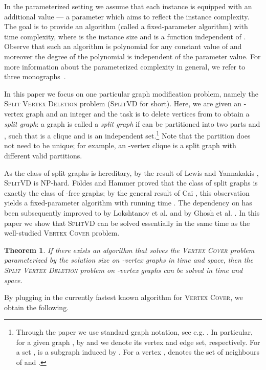 \documentclass{article}
\newcommand{\splitlong}{\textsc{Split Vertex Deletion}\xspace}
\newcommand{\splitvd}{\textsc{SplitVD}\xspace}
\newcommand{\vertexcover}{\textsc{Vertex Cover}\xspace}
\newtheorem{theorem}{Theorem}[section]
\theoremstyle{definition}
\begin{document}
In the parameterized setting we assume that each instance is equipped with 
an additional value  --- a parameter which aims to reflect
the instance complexity.
The goal is to provide an algorithm (called a fixed-parameter algorithm) with 
time complexity, where  is the instance size and 
is a function independent of .
Observe that such an algorithm is polynomial for any constant value of 
and moreover the degree of the polynomial is independent of the parameter value.
For more information about the parameterized complexity in general,
we refer to three monographs~\cite{downey-fellows:book, grohe:book, niedermeier:book}.

In this paper we focus on one particular graph modification problem, namely
the \splitlong problem (\splitvd for short). Here, we are given an -vertex graph
 and an integer  and the task is to delete  vertices from 
to obtain a {\em{split graph}}: a graph  is called a {\em{split graph}}
if  can be partitioned into two parts  and , such that 
is a clique and  is an independent set.\footnote{Through the paper
  we use standard graph notation, see e.g. \cite{diestel}.
  In particular, for a given graph , by  and  we denote
  its vertex and edge set, respectively. For a set ,
   is a subgraph induced by . For a vertex ,  denotes the set of
  neighbours of  and .}
Note that the partition  does not need to be unique; for example,
an -vertex clique is a split graph with  different valid partitions.

As the class of split graphs is hereditary, by the result of Lewis and Yannakakis \cite{lewis-yannakakis}, \splitvd is NP-hard.
F\"{o}ldes and Hammer \cite{hammer} proved that the class of split graphs
is exactly the class of -free graphs; by the general
result of Cai \cite{cai:vd}, this observation yields a fixed-parameter
algorithm with running time .
The dependency on  has been subsequently improved
to  by Lokshtanov et al. \cite{saket:lp}
and  by Ghosh et al. \cite{ashutosh}.
In this paper we show that \splitvd can be solved essentially
in the same time as the well-studied \vertexcover problem.

\begin{theorem}\label{thm:alg}
If there exists an algorithm that solves the \vertexcover problem parameterized
by the solution size  on -vertex graphs in  time and  space,
then the \splitlong problem on -vertex graphs can be solved
in  time and  space.
\end{theorem}

By plugging in the currently fastest known algorithm for \vertexcover \cite{vc:best},
   we obtain the following.
\end{document}
